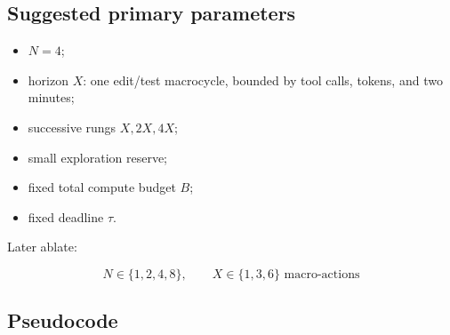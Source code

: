 \documentclass[
  letterpaper,
]{article}
\providecommand{\tightlist}{%
  \setlength{\itemsep}{0pt}\setlength{\parskip}{0pt}}
\begin{document}
\subsection{Suggested primary parameters}\label{suggested-primary-parameters}

\begin{itemize}
\tightlist
\item
  \(N=4\);
\item
  horizon \(X\): one edit/test macrocycle, bounded by tool calls, tokens, and two minutes;
\item
  successive rungs \(X,2X,4X\);
\item
  small exploration reserve;
\item
  fixed total compute budget \(B\);
\item
  fixed deadline \(\tau\).
\end{itemize}

Later ablate:

\[
N\in\{1,2,4,8\},\qquad X\in\{1,3,6\}\text{ macro-actions}
\]

\subsection{Pseudocode}\label{pseudocode}
\end{document}
